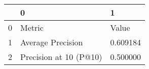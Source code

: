 \begin{tabular}{lll}
\toprule
 & 0 & 1 \\
\midrule
0 & Metric & Value \\
1 & Average Precision & 0.609184 \\
2 & Precision at 10 (P@10) & 0.500000 \\
\bottomrule
\end{tabular}
